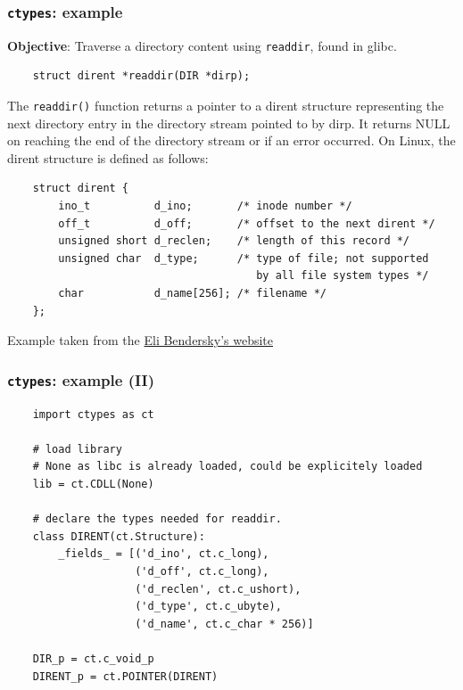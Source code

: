 \documentclass{beamer}
\begin{document}
\begin{frame}[fragile]
  \frametitle{\texttt{ctypes}: example}

  \textbf{Objective}: Traverse a directory content using \texttt{readdir},
  found in glibc.

  \begin{verbatim}
    struct dirent *readdir(DIR *dirp);
  \end{verbatim}

  The \texttt{readdir()} function returns a pointer to a dirent structure
  representing the next directory entry in the directory stream pointed to by
  dirp. It returns NULL on reaching the end of the directory stream or if an
  error occurred. On Linux, the dirent structure is defined as follows:

  \begin{verbatim}
    struct dirent {
        ino_t          d_ino;       /* inode number */
        off_t          d_off;       /* offset to the next dirent */
        unsigned short d_reclen;    /* length of this record */
        unsigned char  d_type;      /* type of file; not supported
                                       by all file system types */
        char           d_name[256]; /* filename */
    };
  \end{verbatim}

  \tiny Example taken from the
  \href{https://eli.thegreenplace.net/2013/03/09/python-ffi-with-ctypes-and-cffi/}{Eli Bendersky's website}
\end{frame}

\begin{frame}[fragile]
  \frametitle{\texttt{ctypes}: example (II)}

  \begin{verbatim}
    import ctypes as ct

    # load library
    # None as libc is already loaded, could be explicitely loaded
    lib = ct.CDLL(None)

    # declare the types needed for readdir.
    class DIRENT(ct.Structure):
        _fields_ = [('d_ino', ct.c_long),
                    ('d_off', ct.c_long),
                    ('d_reclen', ct.c_ushort),
                    ('d_type', ct.c_ubyte),
                    ('d_name', ct.c_char * 256)]

    DIR_p = ct.c_void_p
    DIRENT_p = ct.POINTER(DIRENT)
  \end{verbatim}
\end{frame}
\end{document}
